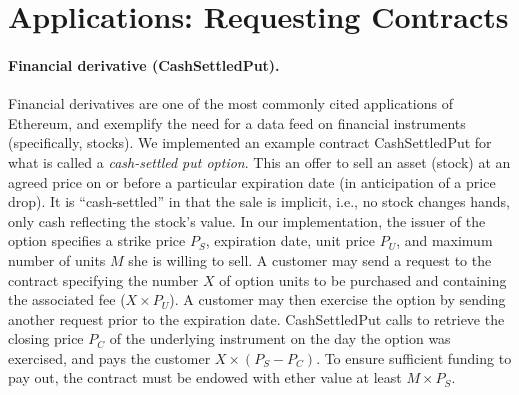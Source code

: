 \section{Applications: Requesting Contracts}

\paragraph{Financial derivative ({\sf CashSettledPut}).} Financial derivatives are one of the most commonly cited applications of Ethereum, and exemplify the need for a data feed on financial instruments (specifically, stocks). We implemented an example contract {\sf CashSettledPut} for what is called a {\em cash-settled put option}. This an offer to sell an asset (stock) at an agreed price on or before a particular expiration date (in anticipation of a price drop). It is ``cash-settled'' in that the sale is implicit, i.e., no stock changes hands, only cash reflecting the stock's value. In our implementation, the issuer of the option specifies a strike price $P_S$, expiration date, unit price $P_U$, and maximum number of units $M$ she is willing to sell. A customer may send a request to the contract specifying the number $X$ of option units to be purchased and containing the associated fee ($X \times P_U$). A customer may then exercise the option by sending another request prior to the expiration date. {\sf CashSettledPut} calls \tc to retrieve the closing price $P_C$ of the underlying instrument on the day the option was exercised, and pays the customer $X \times (P_S - P_C)$. To ensure sufficient funding to pay out, the contract must be endowed with ether value at least $M \times P_S$.

\iffalse
\paragraph{Financial Derivatives.}  In order to implement a financial derivative as a smart contract, we require information about the corresponding financial instrument upon which the derivative depends (typically a stock).  As an example, we implemented a cash-settled put option.  The issuer of the option creates a contract for a particular stock, strike price, time period, unit price, and the maximum number of units he is willing to sell.  Customers may purchase the option by sending requests to the contract along with the associated fee indicating the number of units of the option they would like to buy.  Until the expiration date, customers may choose to exercise the put option by making another request to the option contract.  The contract then requests that TC retrieve the closing price of the underlying instrument on the day the option was exercised, and pays out to the customer the difference between the strike price and the closing price for each unit of the option purchased.  To ensure the contract always has sufficient funds to pay out, it must control value of at least the strike price times the maximum number of units sold.
\fi

